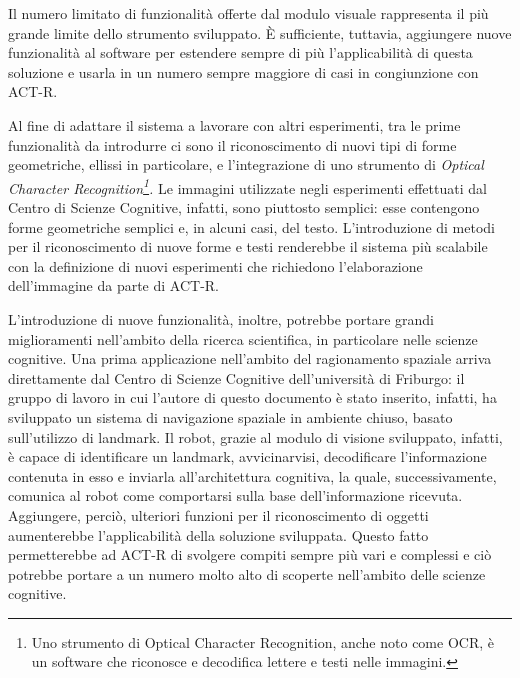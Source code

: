 		Il numero limitato di funzionalità offerte dal modulo visuale rappresenta il più grande limite dello strumento sviluppato. 
		È sufficiente, tuttavia, aggiungere nuove funzionalità al software per estendere sempre di più l'applicabilità di questa soluzione e usarla in un numero sempre maggiore di casi in congiunzione con \mbox{ACT-R}.

		Al fine di adattare il sistema a lavorare con altri esperimenti, tra le prime funzionalità da introdurre ci sono il riconoscimento di nuovi tipi di forme geometriche, ellissi in particolare, e l'integrazione di uno strumento di \emph{Optical Character Recognition\footnote{Uno strumento di Optical Character Recognition, anche noto come OCR, è un software che riconosce e decodifica lettere e testi nelle immagini.}.}
		Le immagini utilizzate negli esperimenti effettuati dal Centro di Scienze Cognitive, infatti, sono piuttosto semplici: esse contengono forme geometriche semplici e, in alcuni casi, del testo.
		L'introduzione di metodi per il riconoscimento di nuove forme e testi renderebbe il sistema più scalabile con la definizione di nuovi esperimenti che richiedono l'elaborazione dell'immagine da parte di \mbox{ACT-R}.

		L'introduzione di nuove funzionalità, inoltre, potrebbe portare grandi miglioramenti nell'ambito della ricerca scientifica, in particolare nelle scienze cognitive.
		Una prima applicazione nell'ambito del ragionamento spaziale arriva direttamente dal Centro di Scienze Cognitive dell'università di Friburgo: il gruppo di lavoro in cui l'autore di questo documento è stato inserito, infatti, ha sviluppato un sistema di navigazione spaziale in ambiente chiuso, basato sull'utilizzo di landmark.
		Il robot, grazie al modulo di visione sviluppato, infatti, è capace di identificare un landmark, avvicinarvisi, decodificare l'informazione contenuta in esso e inviarla all'architettura cognitiva, la quale, successivamente, comunica al robot come comportarsi sulla base dell'informazione ricevuta.
		Aggiungere, perciò, ulteriori funzioni per il riconoscimento di oggetti aumenterebbe l'applicabilità della soluzione sviluppata.	
		Questo fatto permetterebbe ad \mbox{ACT-R} di svolgere compiti sempre più vari e complessi e ciò potrebbe portare a un numero molto alto di scoperte nell'ambito delle scienze cognitive.


